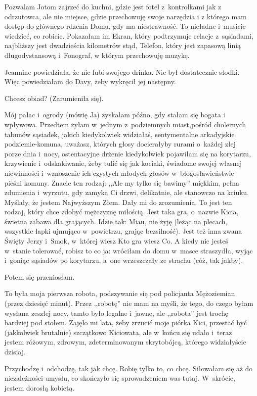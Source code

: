 \documentclass[oneside,polish,12pt,sfheadings]{mwbk}
\begin{document}
Pozwalam Jotom zajrzeć do kuchni, gdzie jest fotel z~kontrolkami jak
z odrzutowca, ale nie miejsce, gdzie przechowuję swoje narzędzia i
z którego mam dostęp do głównego rdzenia Domu, gdy ma niestrawność.
To nieładne i~musicie wiedzieć, co robicie. Pokazałam im Ekran, który
podtrzymuje relacje z~sąsiadami, najbliższy jest dwadzieścia kilometrów
stąd, Telefon, który jest zapasową linią długodystansową i~Fonograf,
w którym przechowuję muzykę.

Jeannine powiedziała, że nie lubi swojego drinka. Nie był dostatecznie
słodki. Więc powiedziałam do Davy, żeby wykręcił jej następny.

Chcesz obiad? (Zarumieniła się).

Mój pałac i~ogrody (mówię Ja) zyskałam późno, gdy stałam się bogata
i wpływowa. Przedtem żyłam w~jednym z~podziemnych miast,pośród cholernych
tabunów sąsiadek, jakich kiedykolwiek widziałaś, sentymentalne arkadyjskie
podziemie-komuna, uważasz, których głosy docierałyby rurami o~każdej
złej porze dnia i~nocy, ostentacyjne drżenie kiedykolwiek pojawiłam
się na korytarzu, krzywienie i~odskakiwanie, żeby tulić się jak kociaki,
świadome swojej własnej niewinności i~wznoszenie ich czystych młodych
głosów w~błogosławieństwie pieśni komuny. Znacie ten rodzaj: ,,Ale
my tylko się bawimy'' miękkim, pełna zdumienia i~wyrzutu, gdy zamyka
Ci drzwi, delikatnie, ale stanowczo na kciuku. Myślały, że jestem
Najwyższym Złem. Dały mi do zrozumienia. To jest ten rodzaj, który
chce zdobyć mężczyznę miłością. Jest taka gra, o~nazwie Kicia, świetna
zabawa dla grających. Idzie tak: Miau, nie żyję (leżąc na plecach,
wszystkie łapki ujmująco w~powietrzu, grając bezsilność). Jest też
inna zwana Święty Jerzy i~Smok, w~której wiesz Kto gra wiesz Co. A
kiedy nie jesteś w~stanie tolerować, robisz to co ja: wróciłam do
domu w~masce straszydła, wyjąc i~goniąc sąsiadów po korytarzu, a~one
wrzeszczały ze strachu (cóż, tak jakby).

Potem się przeniosłam.

To była moja pierwsza robota, podszywanie się pod policjanta Mężoziemian
(przez dziesięć minut). Przez ,,robotę'' nie mam na myśli, że tego,
do czego byłam wysłana zeszłej nocy, tamto było legalne i~jawne, ale ,,robota'' jest trochę bardziej pod stołem. Zajęło mi lata, żeby zrzucić
moje piórka Kici, przestać być (jakkolwiek brutalnie) szczątkowo Kiciowata,
ale w~końcu się udało i~teraz jestem różowym, zdrowym, zdeterminowanym
skrytobójcą, którego widziałyście dzisiaj.

Przychodzę i~odchodzę, tak jak chcę. Robię tylko to, co chcę. Siłowałam
się aż do niezależności umysłu, co skończyło się sprowadzeniem was
tutaj. W~skrócie, jestem dorosłą kobietą.
\end{document}
